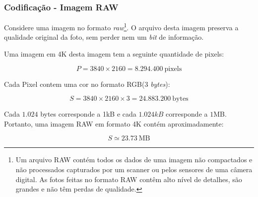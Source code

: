 \documentclass[10pt, handout]{beamer}
\begin{document}
\begin{frame}[t]
\begin{center}
    \end{center}
\end{frame}

\def\nota1{Um arquivo RAW contém todos os dados de uma imagem não compactados e não processados capturados por um scanner ou pelos sensores de uma câmera digital. As fotos feitas no formato RAW contêm alto nível de detalhes, são grandes e não têm perdas de qualidade.}
\begin{frame}[t]
    \frametitle{Codificação - Imagem RAW}
    Considere uma imagem no formato \emph{raw}\footnote{\nota1}. O arquivo desta imagem preserva a qualidade original da foto, sem perder nem um \emph{bit} de informação.\vfill

    Uma imagem em 4K desta imagem tem a seguinte quantidade de pixels:

    \[P =  3840 \times 2160 = 8.294.400\ \text{pixels}\]

    \vfill

    Cada Pixel contem uma cor no formato RGB(3 \emph{bytes}):

    \[S = 3840 \times 2160 \times 3 = 24.883.200\ \text{bytes}\]

    \vfill

    Cada $1.024$ bytes corresponde a 1kB e cada $1.024kB$ corresponde a $1$MB. Portanto, uma imagem RAW em formato 4K contém aproximadamente:

    \[S \simeq 23.73\ \text{MB}\]
\end{frame}
\end{document}
